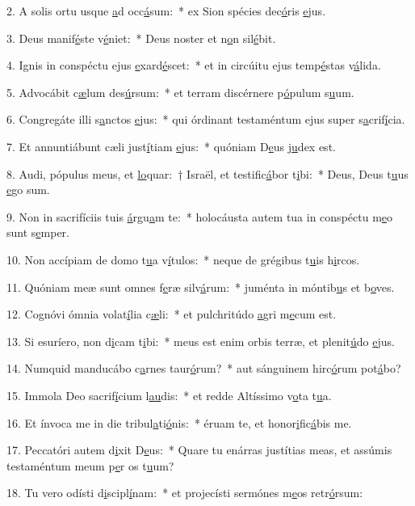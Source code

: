 2. A solis ortu usque \uline{a}d occ\uline{á}sum:~* ex Sion spécies dec\uline{ó}ris \uline{e}jus.\par 
3. Deus manif\uline{é}ste v\uline{é}niet:~* Deus noster et n\uline{o}n sil\uline{é}bit.\par 
4. Ignis in conspéctu ejus \uline{e}xard\uline{é}scet:~* et in circúitu ejus temp\uline{é}stas v\uline{á}lida.\par 
5. Advocábit c\uline{æ}lum des\uline{ú}rsum:~* et terram discérnere p\uline{ó}pulum s\uline{u}um.\par 
6. Congregáte illi s\uline{a}nctos \uline{e}jus:~* qui órdinant testaméntum ejus super s\uline{a}crif\uline{í}cia.\par 
7. Et annuntiábunt cæli just\uline{í}tiam \uline{e}jus:~* quóniam D\uline{e}us j\uline{u}dex est.\par 
8. Audi, pópulus meus, et \uline{lo}quar:~† Israël, et testific\uline{á}bor t\uline{i}bi:~* Deus, Deus t\uline{u}us \uline{e}go sum.\par 
9. Non in sacrifíciis tuis \uline{á}rgu\uline{a}m te:~* holocáusta autem tua in conspéctu m\uline{e}o sunt s\uline{e}mper.\par 
10. Non accípiam de domo t\uline{u}a v\uline{í}tulos:~* neque de grégibus t\uline{u}is h\uline{i}rcos.\par 
11. Quóniam meæ sunt omnes f\uline{e}ræ silv\uline{á}rum:~* juménta in móntib\uline{u}s et b\uline{o}ves.\par 
12. Cognóvi ómnia volat\uline{í}lia c\uline{æ}li:~* et pulchritúdo \uline{a}gri m\uline{e}cum est.\par 
13. Si esuríero, non d\uline{i}cam t\uline{i}bi:~* meus est enim orbis terræ, et plenit\uline{ú}do \uline{e}jus.\par 
14. Numquid manducábo c\uline{a}rnes taur\uline{ó}rum?~* aut sánguinem hirc\uline{ó}rum pot\uline{á}bo?\par 
15. Immola Deo sacrif\uline{í}cium l\uline{au}dis:~* et redde Altíssimo v\uline{o}ta t\uline{u}a.\par 
16. Et ínvoca me in die tribul\uline{a}ti\uline{ó}nis:~* éruam te, et honor\uline{i}fic\uline{á}bis me.\par 
17. Peccatóri autem d\uline{i}xit D\uline{e}us:~* Quare tu enárras justítias meas, et assúmis testaméntum meum p\uline{e}r os t\uline{u}um?\par 
18. Tu vero odísti d\uline{i}scipl\uline{í}nam:~* et projecísti sermónes m\uline{e}os retr\uline{ó}rsum:\par 
